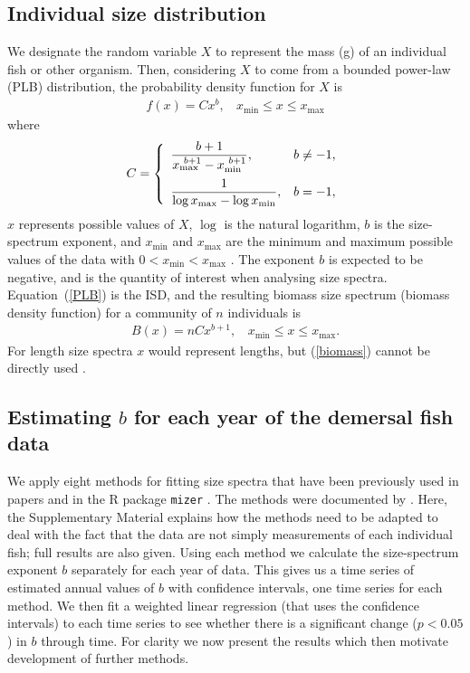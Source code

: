\documentclass[12pt, letter]{article}
\newcommand{\eb}{\begin{eqnarray}}
\newcommand{\ee}{\end{eqnarray}}
\newcommand{\xmin}{x_{\mathrm{min}}}
\newcommand{\xmax}{x_{\mathrm{max}}}
\newcommand{\MEE}{erpbb17}     %
\begin{document}

\subsection{Individual size distribution}

We designate the random variable $X$ to represent the mass (g) of an individual fish
or other organism. Then, considering $X$ to come from a bounded power-law (PLB)
distribution, the probability density function for $X$ is \eb f(x) = C
x^b,~~~~\xmin \leq x \leq \xmax
\label{PLB}
\ee where \eb C = \left\{ \begin{array}{ll} \dfrac{b + 1}{\xmax^{~b + 1} -
    \xmin^{~b + 1}}, \vspace{2mm} & b \neq -1, \\ \dfrac{1}{\log \xmax - \log
    \xmin}, & b = -1,
  \end{array}
  \right.
\label{PLB.C}
\ee $x$ represents possible values of $X$, $\log$ is the natural logarithm, $b$
is the size-spectrum exponent, and $\xmin$ and $\xmax$ are the minimum and
maximum possible values of the data with $0 < \xmin < \xmax$ \citep{\MEE}. The
exponent $b$ is expected to be negative, and is the quantity of interest when
analysing size spectra. Equation~(\ref{PLB}) is the ISD,
and the resulting biomass size spectrum (biomass density function) for a
community of $n$ individuals is
\eb
B(x) = n C x^{b+1},~~~~\xmin \leq x \leq \xmax.
\label{biomass}
\ee
For length size spectra $x$ would represent lengths, but (\ref{biomass}) cannot
be directly used \citep{\MEE}.

\subsection{Estimating $b$ for each year of the demersal fish data}

We apply eight methods for fitting size spectra that have been
previously used in papers and in the
R package {\tt mizer} \citep{sba14}. The methods were
documented by \citet{\MEE}. Here, the Supplementary Material explains how
the methods need to be adapted to deal with the fact that the data are not
simply measurements of each individual fish; full results are also given.
Using each method we calculate
the size-spectrum exponent $b$ separately for each year of data.
This gives us a time series of estimated annual values of $b$
with confidence intervals, one time series for each method. We then fit a
weighted linear regression (that uses the confidence intervals) to each
time series to see whether there is a
significant change ($p < 0.05$) in $b$ through time. For clarity we now
present the results which then motivate development of further methods.
\end{document}
